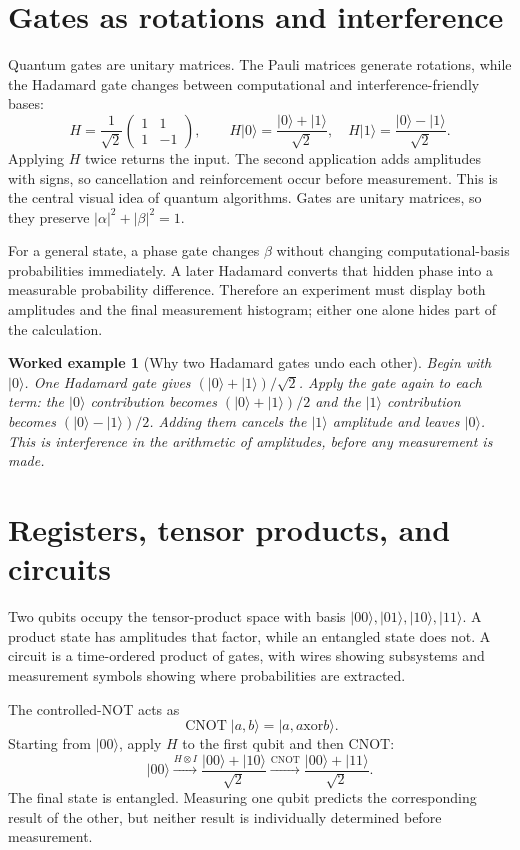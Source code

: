 \documentclass[11pt,oneside]{book}
\newcommand{\ket}[1]{\lvert #1\rangle}
\theoremstyle{reviewstyle}
\newtheorem{example}{Worked example}[chapter]
\begin{document}
\section{Gates as rotations and interference}
Quantum gates are unitary matrices. The Pauli matrices generate rotations, while the Hadamard gate changes between computational and interference-friendly bases:
\begin{equation}
H=\frac1{\sqrt2}\begin{pmatrix}1&1\\1&-1\end{pmatrix},\qquad
H\ket0=\frac{\ket0+\ket1}{\sqrt2},\quad
H\ket1=\frac{\ket0-\ket1}{\sqrt2}.
\end{equation}
Applying $H$ twice returns the input. The second application adds amplitudes with signs, so cancellation and reinforcement occur before measurement. This is the central visual idea of quantum algorithms. Gates are unitary matrices, so they preserve $|\alpha|^2+|\beta|^2=1$.

For a general state, a phase gate changes $\beta$ without changing computational-basis probabilities immediately. A later Hadamard converts that hidden phase into a measurable probability difference. Therefore an experiment must display both amplitudes and the final measurement histogram; either one alone hides part of the calculation.

\begin{example}[Why two Hadamard gates undo each other]
Begin with $\ket0$. One Hadamard gate gives $(\ket0+\ket1)/\sqrt2$. Apply the gate again to each term: the $\ket0$ contribution becomes $(\ket0+\ket1)/2$ and the $\ket1$ contribution becomes $(\ket0-\ket1)/2$. Adding them cancels the $\ket1$ amplitude and leaves $\ket0$. This is interference in the arithmetic of amplitudes, before any measurement is made.
\end{example}

\section{Registers, tensor products, and circuits}
Two qubits occupy the tensor-product space with basis $\ket{00},\ket{01},\ket{10},\ket{11}$. A product state has amplitudes that factor, while an entangled state does not. A circuit is a time-ordered product of gates, with wires showing subsystems and measurement symbols showing where probabilities are extracted.

The controlled-NOT acts as
\begin{equation}
\operatorname{CNOT}\ket{a,b}=\ket{a,a\mathbin{\mathrm{xor}}b}.
\end{equation}
Starting from $\ket{00}$, apply $H$ to the first qubit and then CNOT:
\begin{equation}
\ket{00}\xrightarrow{H\otimes I}
\frac{\ket{00}+\ket{10}}{\sqrt2}
\xrightarrow{\operatorname{CNOT}}
\frac{\ket{00}+\ket{11}}{\sqrt2}.
\end{equation}
The final state is entangled. Measuring one qubit predicts the corresponding result of the other, but neither result is individually determined before measurement.
\end{document}
